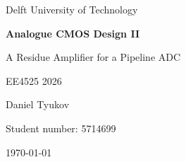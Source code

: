 \documentclass[11pt,a4paper]{article}
\begin{document}
\begin{titlepage}
  \centering
  \vspace*{5cm}
  {\Large Delft University of Technology\par}
  \vspace{1.5cm}
  {\huge\bfseries Analogue CMOS Design II\par}
  \vspace{0.4cm}
  {\Large A Residue Amplifier for a Pipeline ADC\par}
  \vspace{0.4cm}
  {\Large EE4525 2026\par}
  \vspace{2cm}
  {\Large Daniel Tyukov\par}
  {\large Student number: 5714699\par}
  \vfill
  {\large \today\par}
\end{titlepage}
\setcounter{page}{2}

\end{document}
